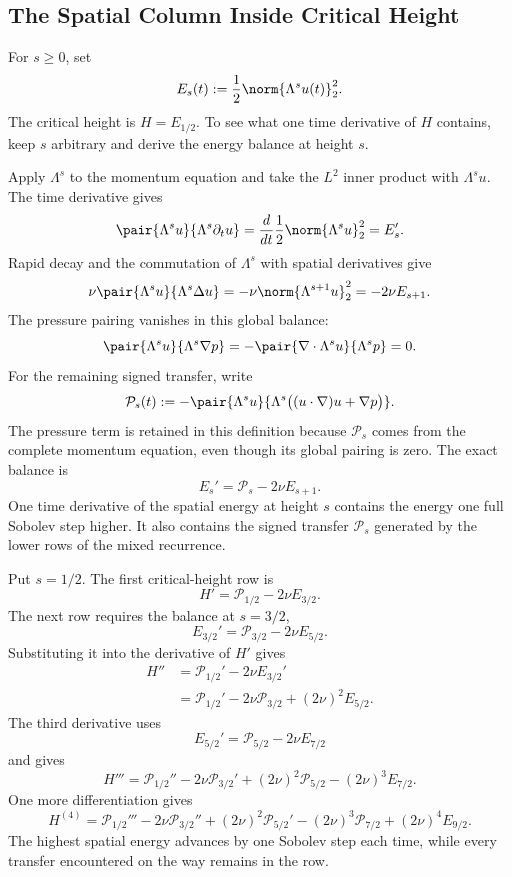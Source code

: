
\subsection{The Spatial Column Inside Critical Height}\label{sub:TheSpatialColumnInsideCriticalHeight}

For \(s\geq0\), set
\[
  E_s(t)
  :=
  \frac12\norm{\Lambda^su(t)}_2^2.
\]
The critical height is \(H=E_{1/2}\).
To see what one time derivative of \(H\) contains, keep \(s\) arbitrary and derive the energy balance at height \(s\).

Apply \(\Lambda^s\) to the momentum equation and take the \(L^2\) inner product with \(\Lambda^su\).
The time derivative gives
\[
  \pair{\Lambda^su}{\Lambda^s\partial_tu}
  =
  \frac{d}{dt}
  \frac12\norm{\Lambda^su}_2^2
  =
  E_s'.
\]
Rapid decay and the commutation of \(\Lambda^s\) with spatial derivatives give
\[
  \nu\pair{\Lambda^su}{\Lambda^s\Delta u}
  =
  -\nu\norm{\Lambda^{s+1}u}_2^2
  =
  -2\nu E_{s+1}.
\]
The pressure pairing vanishes in this global balance:
\[
  \pair{\Lambda^su}{\Lambda^s\nabla p}
  =
  -\pair{\nabla\cdot\Lambda^su}{\Lambda^sp}
  =
  0.
\]
For the remaining signed transfer, write
\[
  \mathcal P_s(t)
  :=
  -\pair{\Lambda^su}
  {\Lambda^s\bigl((u\cdot\nabla)u+\nabla p\bigr)}.
\]
The pressure term is retained in this definition because \(\mathcal P_s\) comes from the complete momentum equation, even though its global pairing is zero.
The exact balance is
\[
  E_s'
  =
  \mathcal P_s-2\nu E_{s+1}.
\]
One time derivative of the spatial energy at height \(s\) contains the energy one full Sobolev step higher.
It also contains the signed transfer \(\mathcal P_s\) generated by the lower rows of the mixed recurrence.

Put \(s=1/2\).
The first critical-height row is
\[
  H'
  =
  \mathcal P_{1/2}
  -2\nu E_{3/2}.
\]
The next row requires the balance at \(s=3/2\),
\[
  E_{3/2}'
  =
  \mathcal P_{3/2}
  -2\nu E_{5/2}.
\]
Substituting it into the derivative of \(H'\) gives
\begin{align*}
  H''
  &=
  \mathcal P_{1/2}'
  -2\nu E_{3/2}'
  \\
  &=
  \mathcal P_{1/2}'
  -2\nu\mathcal P_{3/2}
  +(2\nu)^2E_{5/2}.
\end{align*}
The third derivative uses
\[
  E_{5/2}'
  =
  \mathcal P_{5/2}
  -2\nu E_{7/2}
\]
and gives
\[
  H'''
  =
  \mathcal P_{1/2}''
  -2\nu\mathcal P_{3/2}'
  +(2\nu)^2\mathcal P_{5/2}
  -(2\nu)^3E_{7/2}.
\]
One more differentiation gives
\[
  H^{(4)}
  =
  \mathcal P_{1/2}'''
  -2\nu\mathcal P_{3/2}''
  +(2\nu)^2\mathcal P_{5/2}'
  -(2\nu)^3\mathcal P_{7/2}
  +(2\nu)^4E_{9/2}.
\]
The highest spatial energy advances by one Sobolev step each time, while every transfer encountered on the way remains in the row.

